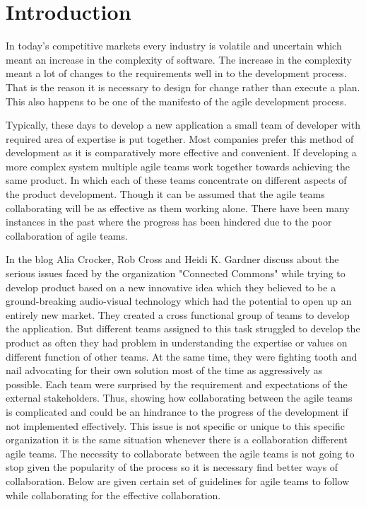 \documentclass[sigconf]{acmart}
\begin{document}
\section{Introduction}
In today's competitive markets every industry is volatile and uncertain which meant an increase in the complexity of software. The increase in the complexity meant a lot of changes to the requirements well in to the development process. That is the reason it is necessary to design for change rather than execute a plan. This also happens to be one of the manifesto of the agile development process. 

Typically, these days to develop a new application a small team of developer with required area of expertise is put together. Most companies prefer this method of development as it is comparatively more effective and convenient. If developing a more complex system multiple agile teams work together towards achieving the same product. In which each of these teams concentrate on different aspects of the product development. Though it can be assumed that the agile teams collaborating will be as effective as them working alone. There have been many instances in the past where the progress has been hindered due to the poor collaboration of agile teams.

In the blog \cite{Alia01} Alia Crocker, Rob Cross and Heidi K. Gardner discuss about the serious issues faced by the organization "Connected Commons" while trying to develop product based on a new innovative idea which they believed to be a ground-breaking audio-visual technology which had the potential to open up an entirely new market. They created a cross functional group of teams to develop the application. But different teams assigned to this task struggled to develop the product as often they had problem in understanding the expertise or values on different function of other teams. At the same time, they were fighting tooth and nail advocating for their own solution most of the time as aggressively as possible. Each team were surprised by the requirement and expectations of the external stakeholders. Thus, showing how collaborating between the agile teams is complicated and could be an hindrance to the progress of the development if not implemented effectively. This issue is not specific or unique to this specific organization it is the same situation whenever there is a collaboration different agile teams. The necessity to collaborate between the agile teams is not going to stop given the popularity of the process so it is necessary find better ways of collaboration. Below are given certain set of guidelines for agile teams to follow while collaborating for the effective collaboration.
\end{document}
